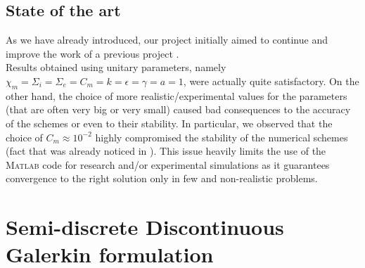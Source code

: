 \documentclass[a4paper,11pt]{article}
\begin{document}
    \subsection{State of the art}\label{past}
    As we have already introduced, our project initially aimed to continue and improve the work of a previous project \cite{marta}. \\
    Results obtained using unitary parameters, namely $\chi_m =\Sigma_i= \Sigma_e= C_m= k = \epsilon= \gamma= a=1$, were actually quite satisfactory. On the other hand, the choice of more realistic/experimental values for the parameters (that are often very big or very small) caused bad consequences to the accuracy of the schemes or even to their stability. In particular, we observed that the choice of $C_m \approx 10^{-2}$ highly compromised the stability of the numerical schemes (fact that was already noticed in \cite{andreotti}).
    This issue heavily limits the use of the \textsc{Matlab} code for research and/or experimental simulations as it guarantees convergence to the right solution only in few and non-realistic problems.  \\

   
\newpage

    \section{Semi-discrete Discontinuous Galerkin formulation}
\end{document}

